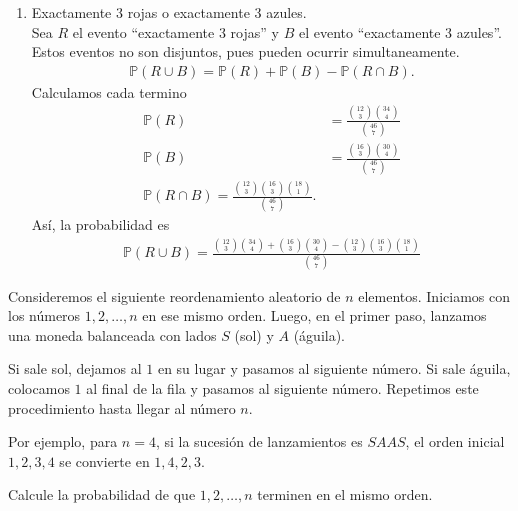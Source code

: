 \message{ !name(tarea2.tex)}\documentclass[12pt,a4paper]{article}
\begin{document}
\begin{solucion}
\begin{enumerate}
            Entonces
            \begin{align*}
                \mathbb{P}=\frac{\binom{12}{7}+\binom{16}{7}+\binom{18}{7}}{\binom{46}{7}}.
            \end{align*}
            \item[(d)] Exactamente 3 rojas o exactamente 3 azules.\\
            Sea $R$ el evento “exactamente 3 rojas” y $B$ el evento “exactamente 3 azules”.
            Estos eventos no son disjuntos, pues pueden ocurrir simultaneamente.
            \begin{align*}
                \mathbb{P}(R\cup B)=\mathbb{P}(R)+\mathbb{P}(B)-\mathbb{P}(R\cap B).
            \end{align*}
            Calculamos cada termino
            \begin{align*}
                \mathbb{P}(R)&=\frac{\binom{12}{3}\binom{34}{4}}{\binom{46}{7}}\\
                \mathbb{P}(B)&=\frac{\binom{16}{3}\binom{30}{4}}{\binom{46}{7}}\\
                \mathbb{P}(R\cap B)=\frac{\binom{12}{3}\binom{16}{3}\binom{18}{1}}{\binom{46}{7}}.
            \end{align*}
            Así, la probabilidad es
            \begin{align*}
                \mathbb{P}(R\cup B)=\frac{\binom{12}{3}\binom{34}{4}+\binom{16}{3}\binom{30}{4}-\binom{12}{3}\binom{16}{3}\binom{18}{1}}{\binom{46}{7}}
            \end{align*}
        \end{enumerate}
    \end{solucion}

    \begin{mdframed}[style=mdbluebox,frametitle={Ejercicio 8}]
        Consideremos el siguiente reordenamiento aleatorio de $n$ elementos. 
        Iniciamos con los números $1,2,\dots,n$ en ese mismo orden. Luego, en el primer paso, 
        lanzamos una moneda balanceada con lados $S$ (sol) y $A$ (águila). 

        Si sale sol, dejamos al $1$ en su lugar y pasamos al siguiente número. 
        Si sale águila, colocamos $1$ al final de la fila y pasamos al siguiente número. 
        Repetimos este procedimiento hasta llegar al número $n$. 

        Por ejemplo, para $n=4$, si la sucesión de lanzamientos es $S A A S$, 
        el orden inicial $1,2,3,4$ se convierte en $1,4,2,3$.

        Calcule la probabilidad de que $1,2,\dots,n$ terminen en el mismo orden.
    \end{mdframed}
\end{document}
